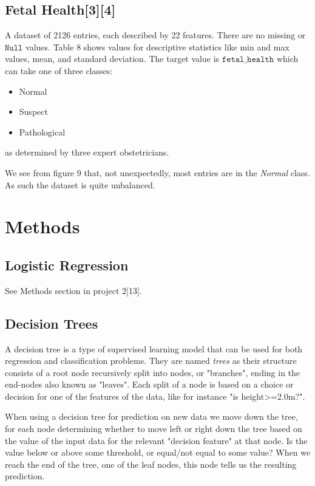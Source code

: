 \documentclass[11pt]{article}
\begin{document}
    \hypertarget{fetal-health}{%
\subsection{Fetal Health[3][4]}\label{fetal-health}}

A dataset of 2126 entries, each described by 22 features. There are no
missing or $\texttt{Null}$ values. Table 8 shows values for descriptive
statistics like min and max values, mean, and standard deviation. The
target value is \(\texttt{fetal\_health}\) which can take one of three
classes:
\begin{itemize}
	\item Normal
	\item Suspect
	\item Pathological
\end{itemize}
as determined by three expert obstetricians.

We see from figure 9 that, not unexpectedly, most entries are in
the \emph{Normal} class. As such the dataset is quite unbalanced.

    \hypertarget{methods}{%
\section{Methods}\label{methods}}

    \hypertarget{log-reg}{%
	\subsection{Logistic Regression}\label{log-reg}}

See Methods section in project 2[13].

    \hypertarget{decision-trees}{%
\subsection{Decision Trees}\label{decision-trees}}

A decision tree is a type of supervised learning model that can be used
for both regression and classification problems. They are named
\emph{trees} as their structure consists of a root node recursively
split into nodes, or "branches", ending in the end-nodes also known as
"leaves". Each split of a node is based on a choice or decision for
one of the features of the data, like for instance "is
height\textgreater=2.0m?".

When using a decision tree for prediction on new data we move down the tree, for each node determining whether to move left or right down the tree based on the value of the input data for the relevant
"decision feature" at that node. Is the value below or above some
threshold, or equal/not equal to some value? When we reach the end of
the tree, one of the leaf nodes, this node tells us the resulting
prediction.
\end{document}
